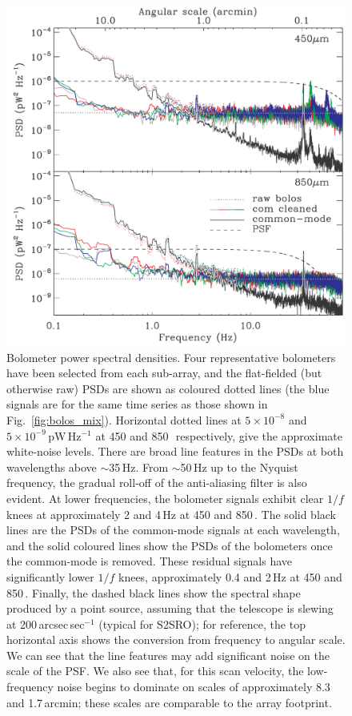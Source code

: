 \documentclass[useAMS,usenatbib,nofootinbib]{mn2e}
\begin{document}
\begin{figure}
\centering
\includegraphics[width=\linewidth]{pspec.pdf}
\caption{Bolometer power spectral densities. Four representative
  bolometers have been selected from each sub-array, and the
  flat-fielded (but otherwise raw) PSDs are shown as coloured dotted
  lines (the blue signals are for the same time series as those shown
  in Fig.~\ref{fig:bolos_mix}). Horizontal dotted lines at $5 \times
  10^{-8}$ and $5 \times 10^{-9}$\,pW\,Hz$^{-1}$ at 450 and
  850\,\micron\ respectively, give the approximate white-noise
  levels. There are broad line features in the PSDs at both
  wavelengths above $\sim$35\,Hz. From $\sim$50\,Hz up to the Nyquist
  frequency, the gradual roll-off of the anti-aliasing filter is also
  evident.  At lower frequencies, the bolometer signals exhibit clear
  $1/f$ knees at approximately 2 and 4\,Hz at 450 and
  850\,\micron. The solid black lines are the PSDs of the common-mode
  signals at each wavelength, and the solid coloured lines show the
  PSDs of the bolometers once the common-mode is removed. These
  residual signals have significantly lower $1/f$ knees, approximately
  0.4 and 2\,Hz at 450 and 850\,\micron. Finally, the dashed black
  lines show the spectral shape produced by a point source, assuming
  that the telescope is slewing at 200\,arcsec\,sec$^{-1}$ (typical
  for S2SRO); for reference, the top horizontal axis shows the
  conversion from frequency to angular scale. We can see that the line
  features may add significant noise on the scale of the PSF. We also
  see that, for this scan velocity, the low-frequency noise begins to
  dominate on scales of approximately 8.3 and 1.7\,arcmin; these scales
  are comparable to the array footprint.}
\label{fig:pspec}
\end{figure}
\end{document}
